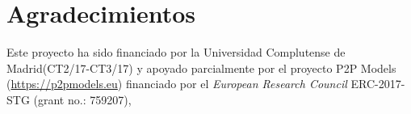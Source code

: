 \section{Agradecimientos}

Este proyecto ha sido financiado por la Universidad Complutense de Madrid(CT2/17-CT3/17)
y apoyado parcialmente por el proyecto P2P Models (\url{https://p2pmodels.eu})
financiado por el \emph{European Research Council} ERC-2017-STG (grant no.: 759207),

